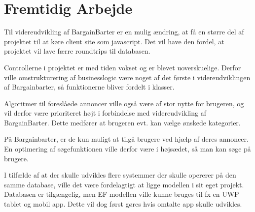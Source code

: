 \chapter{Fremtidig Arbejde}

Til videreudvikling af BargainBarter er en mulig ændring, at få en større del af projektet til at køre client site som javascript. Det vil have den fordel, at projektet vil lave færre roundtrips til databasen. 

\noindent Controllerne i projektet er med tiden vokset og er blevet uoverskuelige. Derfor ville omstrukturering af businesslogic være noget af det første i videreudviklingen af Bargainbarter, så funktionerne bliver fordelt i klasser. 

\noindent Algoritmer til foreslåede annoncer ville også være af stor nytte for brugeren, og vil derfor være prioriteret højt i forbindelse med videreudvikling af BargainBarter. Dette medfører at brugeren evt. kan vælge ønskede kategorier. 

\noindent På Bargainbarter, er de kun muligt at tilgå brugere ved hjælp af deres annoncer. En optimering af søgefunktionen ville derfor være i højsædet, så man kan søge på brugere. 

\noindent I tilfælde af at der skulle udvikles flere systemmer der skulle opererer på den samme database, ville det være fordelagtigt at ligge modellen i sit eget projekt. Databasen er tilgængelig, men EF modellen ville kunne bruges til fx en UWP tablet og mobil app. Dette vil dog først gøres hvis omtalte app skulle udvikles.  